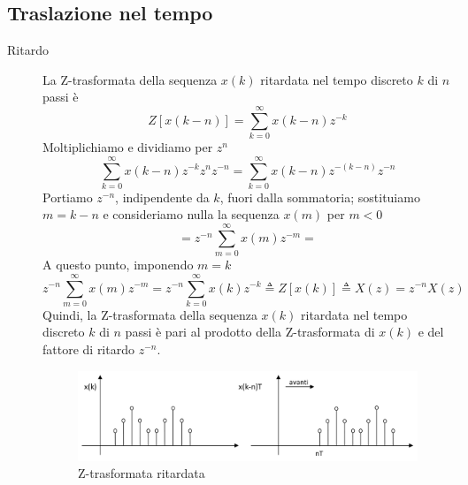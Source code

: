\documentclass[a4paper]{report}
\begin{document}
\subsection{Traslazione nel tempo}
\begin{description}
\item[Ritardo]
  La Z-trasformata della sequenza $x(k)$ ritardata nel tempo
  discreto $k$ di $n$ passi \`e
  \[
  Z[x(k -n)] = \sum\limits_{k=0}^{\infty} x(k -n)z^{-k}
  \]
  Moltiplichiamo e dividiamo per $z^n$
  \[
  \sum\limits_{k=0}^{\infty} x(k - n) z^{-k} z^n z^{-n} =
  \sum\limits_{k=0}^{\infty} x(k - n) z^{-(k - n)} z^{-n}
  \]
  Portiamo $z^{-n}$, indipendente da $k$, fuori dalla sommatoria;
  sostituiamo $m = k - n$ e consideriamo nulla la sequenza $x(m)$
  per $m < 0$
  \[
  = z^{-n} \sum\limits_{m = 0}^{\infty} x(m) z^{-m} = 
  \]
  A questo punto, imponendo $m = k$
  \[
  z^{-n} \sum\limits_{m = 0}^{\infty} x(m) z^{-m} = z^{-n}
  \sum\limits_{k = 0}^{\infty} x(k) z^{-k} \triangleq Z[x(k)]
  \triangleq X(z) = z^{-n}X(z)
  \]
  Quindi, la Z-trasformata della sequenza $x(k)$ ritardata nel tempo
  discreto $k$ di $n$ passi \`e pari al prodotto della Z-trasformata
  di $x(k)$ e del fattore di ritardo $z^{-n}$.
  \begin{figure}[!h]
    \begin{center}
      \includegraphics[scale=0.3]{./figures/discretoRitardo.png}
      \caption{Z-trasformata
        ritardata}\label{fig:Z-trasformataRitardo} 
    \end{center}
  \end{figure}
  

\end{description}
\end{document}
